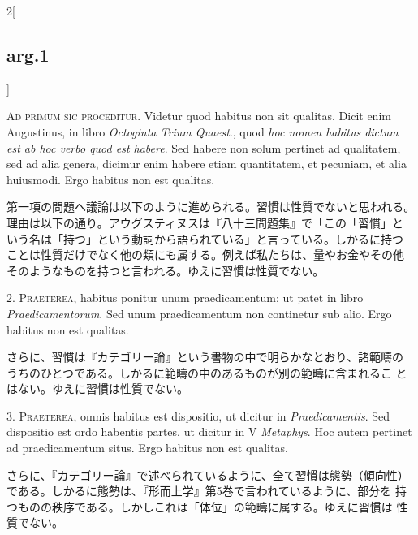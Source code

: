 \documentclass[paper=a4paper,fontsize=10pt,jafontsize=9pt,titlepage]{jlreq}
\begin{document}
\begin{paracol}{2}[\subsection{arg.1}]

{\scshape Ad primum sic proceditur}. Videtur quod habitus non sit
qualitas. Dicit enim Augustinus, in libro {\itshape Octoginta Trium Quaest}.,
quod {\itshape hoc nomen habitus dictum est ab hoc verbo quod est habere}. Sed
habere non solum pertinet ad qualitatem, sed ad alia genera, dicimur
enim habere etiam quantitatem, et pecuniam, et alia huiusmodi. Ergo
habitus non est qualitas.

\switchcolumn

第一項の問題へ議論は以下のように進められる。習慣は性質でないと思われる。
理由は以下の通り。アウグスティヌスは『八十三問題集』で「この「習慣」と
いう名は「持つ」という動詞から語られている」と言っている。しかるに持つ
ことは性質だけでなく他の類にも属する。例えば私たちは、量やお金やその他
そのようなものを持つと言われる。ゆえに習慣は性質でない。


2. {\scshape Praeterea}, habitus ponitur unum praedicamentum; ut patet in libro
{\itshape Praedicamentorum}. Sed unum praedicamentum non continetur sub
alio. Ergo habitus non est qualitas.

\switchcolumn

さらに、習慣は『カテゴリー論』という書物の中で明らかなとおり、諸範疇の
 うちのひとつである。しかるに範疇の中のあるものが別の範疇に含まれるこ
 とはない。ゆえに習慣は性質でない。


3. {\scshape Praeterea}, omnis habitus est dispositio, ut dicitur in
{\itshape Praedicamentis}. Sed dispositio est ordo habentis partes, ut dicitur in
V {\itshape Metaphys}. Hoc autem pertinet ad praedicamentum situs. Ergo habitus
non est qualitas.

\switchcolumn

さらに、『カテゴリー論』で述べられているように、全て習慣は態勢（傾向性）
である。しかるに態勢は、『形而上学』第5巻で言われているように、部分を
持つものの秩序である。しかしこれは「体位」の範疇に属する。ゆえに習慣は
 性質でない。


\end{paracol}
\end{document}
